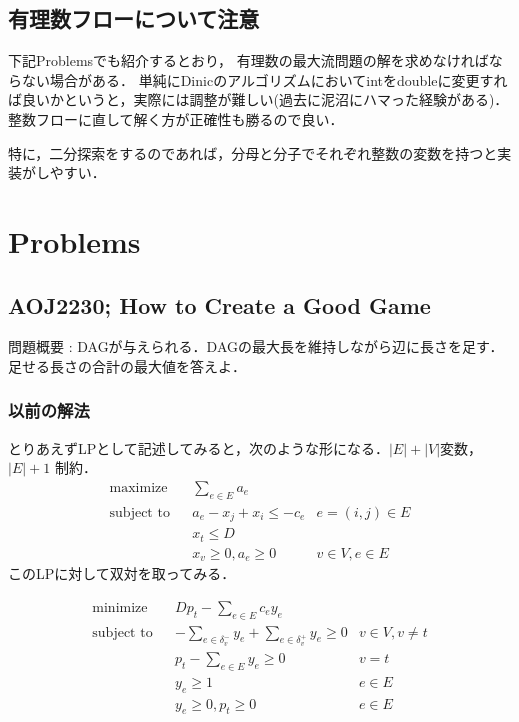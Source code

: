 \documentclass[13pt]{jarticle}
\theoremstyle{nonitalic} %
\begin{document}
\subsection{有理数フローについて注意}

下記Problemsでも紹介するとおり， 有理数の最大流問題の解を求めなければならない場合がある． 単純にDinicのアルゴリズムにおいてintをdoubleに変更すれば良いかというと，実際には調整が難しい(過去に泥沼にハマった経験がある)． 整数フローに直して解く方が正確性も勝るので良い．

特に，二分探索をするのであれば，分母と分子でそれぞれ整数の変数を持つと実装がしやすい．



\section{Problems}

\subsection{AOJ2230; How to Create a Good Game}
\label{prob:aoj2230}

問題概要 : DAGが与えられる．DAGの最大長を維持しながら辺に長さを足す．足せる長さの合計の最大値を答えよ．

\subsubsection{以前の解法}
とりあえずLPとして記述してみると，次のような形になる．$|E|+|V|$変数， $|E|+1$ 制約．
\begin{align}
 &&&&&\textrm{maximize}   && \sum_{e \in E} a_e \\
 &&&&&\textrm{subject to} && a_e - x_j + x_i \leq - c_e & e = (i,j) \in E  &&&&&\\
 &&&&&                    && x_t \leq  D &&&&&& \\
 &&&&&                    && x_v \geq 0, a_e \geq 0 & v \in V, e \in E &&&&&
\end{align}
このLPに対して双対を取ってみる．

\begin{align}
  &&&&& \textrm{minimize}   && Dp_t - \sum_{e \in E} c_e y_e \\
  &&&&& \textrm{subject to} && -\sum_{e \in \delta_v^- } y_e + \sum_{e \in \delta_v^+ } y_e \geq 0 & v \in V, v\neq t &&&&&\\
  &&&&&                     && p_t - \sum_{e \in E} y_e \geq 0 & v=t \\
  &&&&&                     && y_e \geq 1  & e \in E\\
  &&&&&                     && y_e \geq 0, p_t \geq 0 & e\in E
\end{align}
\end{document}
